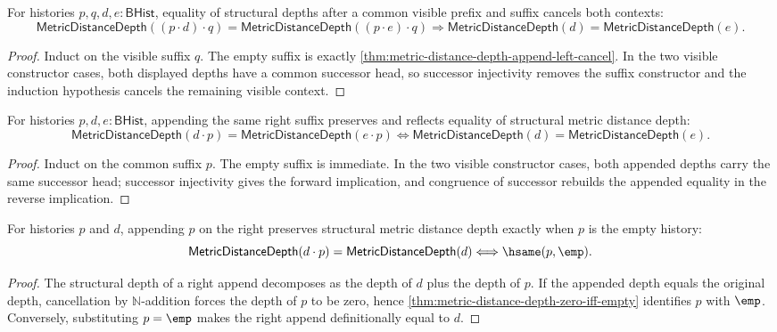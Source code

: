 \begin{theorem}
\label{thm:metric-distance-depth-visible-context-cancel}
For histories $p,q,d,e:\mathsf{BHist}$, equality of structural depths after a
common visible prefix and suffix cancels both contexts:
$$
\mathsf{MetricDistanceDepth}((p\cdot d)\cdot q)
=
\mathsf{MetricDistanceDepth}((p\cdot e)\cdot q)
\Longrightarrow
\mathsf{MetricDistanceDepth}(d)=\mathsf{MetricDistanceDepth}(e).
$$
\end{theorem}
\begin{proof}
Induct on the visible suffix $q$. The empty suffix is exactly
\autoref{thm:metric-distance-depth-append-left-cancel}. In the two visible
constructor cases, both displayed depths have a common successor head, so
successor injectivity removes the suffix constructor and the induction
hypothesis cancels the remaining visible context.
\end{proof}

\begin{theorem}
\label{thm:metric-distance-depth-append-right-cancel-iff}
For histories $p,d,e:\mathsf{BHist}$, appending the same right suffix preserves
and reflects equality of structural metric distance depth:
$$
\mathsf{MetricDistanceDepth}(d\cdot p)
=
\mathsf{MetricDistanceDepth}(e\cdot p)
\Longleftrightarrow
\mathsf{MetricDistanceDepth}(d)=\mathsf{MetricDistanceDepth}(e).
$$
\end{theorem}
\begin{proof}
Induct on the common suffix $p$. The empty suffix is immediate. In the two
visible constructor cases, both appended depths carry the same successor head;
successor injectivity gives the forward implication, and congruence of
successor rebuilds the appended equality in the reverse implication.
\end{proof}

\begin{theorem}
\label{thm:metric-distance-depth-append-right-eq-iff-empty}
For histories $p$ and $d$, appending $p$ on the right preserves structural
metric distance depth exactly when $p$ is the empty history:
$$
\mathsf{MetricDistanceDepth}(d\cdot p)=\mathsf{MetricDistanceDepth}(d)
\Longleftrightarrow
\hsame(p,\emp).
$$
\end{theorem}
\begin{proof}
The structural depth of a right append decomposes as the depth of $d$ plus the
depth of $p$. If the appended depth equals the original depth, cancellation by
\(\mathbb{N}\)-addition forces the depth of $p$ to be zero, hence
\autoref{thm:metric-distance-depth-zero-iff-empty} identifies $p$ with
$\emp$. Conversely, substituting $p=\emp$ makes the right append definitionally
equal to $d$.
\end{proof}

